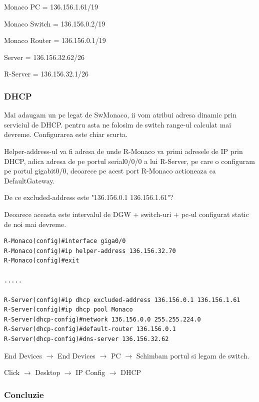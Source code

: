 \documentclass{article}
\begin{document}
Monaco PC = 136.156.1.61/19

Monaco Switch = 136.156.0.2/19

Monaco Router = 136.156.0.1/19


Server = 136.156.32.62/26

R-Server = 136.156.32.1/26

\subsubsection{DHCP}

Mai adaugam un pc legat de SwMonaco, ii vom atribui adresa dinamic prin serviciul de DHCP. pentru asta ne folosim de switch range-ul calculat mai devreme. Configurarea este chiar scurta.

Helper-address-ul va fi adresa de unde R-Monaco va primi adresele de IP prin DHCP, adica adresa de pe portul serial0/0/0 a lui R-Server, pe care o configuram pe portul gigabit0/0, deoarece pe acest port R-Monaco actioneaza ca DefaultGateway.

De ce excluded-address este "136.156.0.1 136.156.1.61"?

Deoarece aceasta este intervalul de DGW + switch-uri + pc-ul configurat static de noi mai devreme.







\begin{verbatim}
R-Monaco(config)#interface giga0/0
R-Monaco(config)#ip helper-address 136.156.32.70
R-Monaco(config)#exit

.....

R-Server(config)#ip dhcp excluded-address 136.156.0.1 136.156.1.61
R-Server(config)#ip dhcp pool Monaco
R-Server(dhcp-config)#network 136.156.0.0 255.255.224.0
R-Server(dhcp-config)#default-router 136.156.0.1
R-Server(dhcp-config)#dns-server 136.156.32.62
\end{verbatim}

End Devices $\rightarrow$ End Devices $\rightarrow$ PC $\rightarrow$ Schimbam portul si legam de switch.



Click $\rightarrow$ Desktop $\rightarrow$ IP Config $\rightarrow$ DHCP





\subsubsection{Concluzie}
\end{document}
